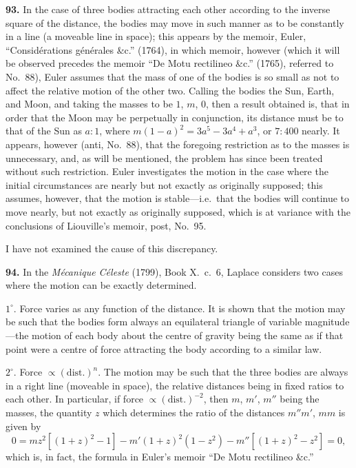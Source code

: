 \documentclass[11pt,a4paper]{book}
\begin{document}
\textbf{93.} In the case of three bodies attracting each other according to the inverse square of the distance, the bodies may move in such manner as to be constantly in a line (a moveable line in space); this appears by the memoir, Euler, ``Consid\'erations g\'en\'erales \&c.'' (1764), in which memoir, however (which it will be observed precedes the memoir ``De Motu rectilineo \&c.'' (1765), referred to No.~88), Euler assumes that the mass of one of the bodies is so small as not to affect the relative motion of the other two. Calling the bodies the Sun, Earth, and Moon, and taking the masses to be $1$, $m$, $0$, then a result obtained is, that in order that the Moon may be perpetually in conjunction, its distance must be to that of the Sun as $a : 1$, where $m(1-a)^2 = 3a^5 - 3a^4 + a^3$, or $7 : 400$ nearly. It appears, however (anti, No.~88), that the foregoing restriction as to the masses is unnecessary, and, as will be mentioned, the problem has since been treated without such restriction. Euler investigates the motion in the case where the initial circumstances are nearly but not exactly as originally supposed; this assumes, however, that the motion is stable---i.e.\ that the bodies will continue to move nearly, but not exactly as originally supposed, which is at variance with the conclusions of Liouville's memoir, post, No.~95.

I have not examined the cause of this discrepancy.

\textbf{94.} In the \textit{M\'ecanique C\'eleste} (1799), Book X.~c.~6, Laplace considers two cases where the motion can be exactly determined.

$1^\circ$. Force varies as any function of the distance. It is shown that the motion may be such that the bodies form always an equilateral triangle of variable magnitude---the motion of each body about the centre of gravity being the same as if that point were a centre of force attracting the body according to a similar law.

$2^\circ$. Force $\propto (\text{dist.})^n$. The motion may be such that the three bodies are always in a right line (moveable in space), the relative distances being in fixed ratios to each other. In particular, if force $\propto (\text{dist.})^{-2}$, then $m$, $m'$, $m''$ being the masses, the quantity $z$ which determines the ratio of the distances $m''m'$, $mm$ is given by
\[
0 = mz^2[(1+z)^2 - 1] - m'(1+z)^2(1-z^2) - m''[(1+z)^2 - z^2] = 0,
\]
which is, in fact, the formula in Euler's memoir ``De Motu rectilineo \&c.''
\end{document}
